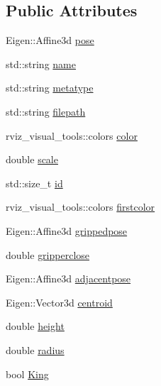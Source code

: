 \subsection*{Public Attributes}
\begin{DoxyCompactItemize}
\item 
Eigen\-::\-Affine3d \hyperlink{structObjectDB_a8026e6c724f6193ab457c5f0ad924551}{pose}
\item 
std\-::string \hyperlink{structObjectDB_aac9d3fa047f7df1d8981fd3c6e97dd25}{name}
\item 
std\-::string \hyperlink{structObjectDB_a0f12d7a7c86ff08dfd2ee1efc93d2c89}{metatype}
\item 
std\-::string \hyperlink{structObjectDB_a2e171343bb62d57745e9bbb02c8a6bf7}{filepath}
\item 
rviz\-\_\-visual\-\_\-tools\-::colors \hyperlink{structObjectDB_a836db3f6e7558a6d9e634b6ea0f0f587}{color}
\item 
double \hyperlink{structObjectDB_a8275f4314ddaba5cf47d65fac944ea96}{scale}
\item 
std\-::size\-\_\-t \hyperlink{structObjectDB_aab8a4b39fdbd287df00a9b38d1cae926}{id}
\item 
rviz\-\_\-visual\-\_\-tools\-::colors \hyperlink{structObjectDB_aae11be013aa483a2b10b6a880d68ee5f}{firstcolor}
\item 
Eigen\-::\-Affine3d \hyperlink{structObjectDB_aea55dd4e3af88e8bd3f545f8f59b8946}{grippedpose}
\item 
double \hyperlink{structObjectDB_a96cb58335a637b741d3d91578a3596d1}{gripperclose}
\item 
Eigen\-::\-Affine3d \hyperlink{structObjectDB_ae11c0410cb15ffe04a5179e59c48c078}{adjacentpose}
\item 
Eigen\-::\-Vector3d \hyperlink{structObjectDB_a28f2e4ccb5338e593f84d57cf174295a}{centroid}
\item 
double \hyperlink{structObjectDB_afa3f0a0fd7cc078010a6265c1061b3d2}{height}
\item 
double \hyperlink{structObjectDB_acd411795d2b56563c2fcfca77d25fc0c}{radius}
\item 
bool \hyperlink{structObjectDB_a790dfadf5010aa532a5607f33f626415}{King}
\end{DoxyCompactItemize}
